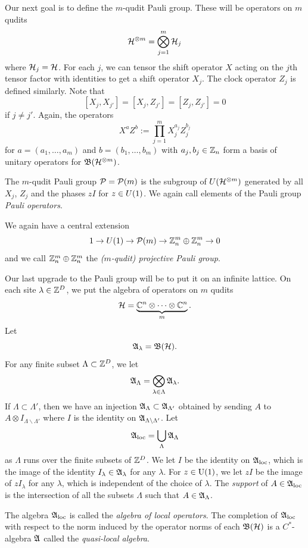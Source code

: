 \documentclass[11pt]{amsart}
\begin{document}
Our next goal is to define the $m$-qudit Pauli group. These will be operators on $m$ qudits
\[ \mathcal{H}^{\otimes m} = \bigotimes_{j=1}^m \mathcal{H}_j\]
where $\mathcal{H}_j = \mathcal{H}$. For each $j$, we can tensor the shift operator $X$ acting on the $j$th tensor factor with identities to get a shift operator $X_j$. The clock operator $Z_j$ is defined similarly. Note that
\[ [X_j,X_{j'}] = [X_j,Z_{j'}] = [Z_j,Z_{j'}] =0\]
if $j\neq j'$. Again, the operators
\[ X^a Z^b:=\prod_{j=1}^m X_j^{a_j}Z_j^{b_j}\]
for $a=(a_1,\ldots, a_m)$ and $b=(b_1,\ldots,b_m)$ with $a_j,b_j \in \mathbb{Z}_n$ form a basis of unitary operators for $\mathfrak{B}(\mathcal{H}^{\otimes m})$.
\begin{defn}
The $m$-qudit Pauli group $\mathcal{P}= \mathcal{P}(m)$ is the subgroup of $U(\mathcal{H}^{\otimes m})$ generated by all $X_j$, $Z_j$ and the phases  $z I$ for $z \in U(1)$. We again call elements of the Pauli group \emph{Pauli operators}.
\end{defn}
We again have a central extension
\[ 1 \to U(1) \to \mathcal{P}(m) \to \mathbb{Z}_n^m\oplus \mathbb{Z}_n^m \to 0\]
and we call $\mathbb{Z}_n^m\oplus \mathbb{Z}_n^m $ the \emph{($m$-qudit) projective Pauli group}.


Our last upgrade to the Pauli group will be to put it on an infinite lattice.  On each site $\lambda\in \mathbb{Z}^D$, we put the algebra of operators on $m$ qudits
\[\mathcal{H} =\underbrace{ \mathbb{C}^n \otimes \cdots \otimes \mathbb{C}^n}_{m}.\]
Let
\[\mathfrak{A}_\lambda  = \mathfrak{B}(\mathcal{H}).\]
For any finite subset $\Lambda \subset \mathbb{Z}^D$, we let
\[\mathfrak{A}_\Lambda = \bigotimes_{\lambda\in \Lambda} \mathfrak{A}_\lambda.\]
If $\Lambda\subset \Lambda'$, then we have an injection $\mathfrak{A}_\Lambda \subset \mathfrak{A}_{\Lambda'}$ obtained by sending $A$ to $A\otimes I_{\Lambda\backslash \Lambda'}$ where $I$ is the identity on $\mathfrak{A}_{\Lambda\backslash \Lambda'}$. Let
\[\mathfrak{A}_{\mathrm{loc}} = \bigcup_{\Lambda} \mathfrak{A}_{\Lambda}\]
as $\Lambda$ runs over the finite subsets of $\mathbb{Z}^D$.   We let $I$ be the identity on $\mathfrak{A}_{\mathrm{loc}}$, which is the image of the identity $I_\lambda \in \mathfrak{A}_\lambda$ for any $\lambda$. For $z\in \rm U(1)$, we let $zI $ be the image of  $zI_\lambda$ for any $\lambda$, which is independent of the choice of $\lambda$. The \emph{support} of $A \in \mathfrak{A}_{\mathrm{loc}}$ is the intersection of all the subsets $\Lambda$ such that $A \in \mathfrak{A}_\Lambda$.

\begin{defn}\label{defn:qlalgebra}
The algebra $\mathfrak{A}_{\mathrm{loc}}$ is called the \emph{algebra of local operators}. The completion of $\mathfrak{A}_{\mathrm{loc}}$ with respect to the norm induced by the operator norms of each $\mathfrak{B}(\mathcal{H})$ is a $C^*$-algebra $\mathfrak{A}$ called the \emph{quasi-local algebra}.
\end{defn}
\end{document}
